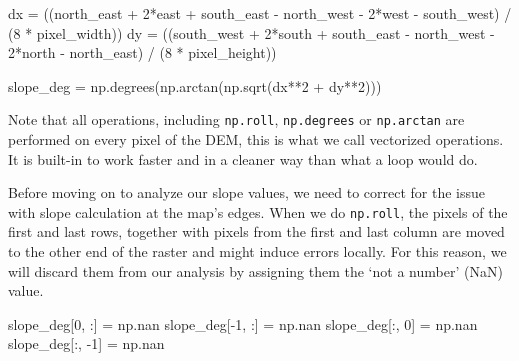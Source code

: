 \documentclass[
  letterpaper,
  DIV=11,
  numbers=noendperiod]{scrartcl}
\newenvironment{Shaded}{\begin{snugshade}}{\end{snugshade}}
\newcommand{\DecValTok}[1]{\textcolor[rgb]{0.68,0.00,0.00}{#1}}
\newcommand{\NormalTok}[1]{\textcolor[rgb]{0.00,0.23,0.31}{#1}}
\newcommand{\OperatorTok}[1]{\textcolor[rgb]{0.37,0.37,0.37}{#1}}
\begin{document}
\begin{Shaded}
\begin{Highlighting}[]
\NormalTok{dx }\OperatorTok{=}\NormalTok{ ((north\_east }\OperatorTok{+} \DecValTok{2}\OperatorTok{*}\NormalTok{east }\OperatorTok{+}\NormalTok{ south\_east }\OperatorTok{{-}}\NormalTok{ north\_west }\OperatorTok{{-}} \DecValTok{2}\OperatorTok{*}\NormalTok{west }\OperatorTok{{-}}\NormalTok{ south\_west)}
      \OperatorTok{/}\NormalTok{ (}\DecValTok{8} \OperatorTok{*}\NormalTok{ pixel\_width))}
\NormalTok{dy }\OperatorTok{=}\NormalTok{ ((south\_west }\OperatorTok{+} \DecValTok{2}\OperatorTok{*}\NormalTok{south }\OperatorTok{+}\NormalTok{ south\_east }\OperatorTok{{-}}\NormalTok{ north\_west }\OperatorTok{{-}} \DecValTok{2}\OperatorTok{*}\NormalTok{north }\OperatorTok{{-}}\NormalTok{ north\_east)}
      \OperatorTok{/}\NormalTok{ (}\DecValTok{8} \OperatorTok{*}\NormalTok{ pixel\_height))}

\NormalTok{slope\_deg }\OperatorTok{=}\NormalTok{ np.degrees(np.arctan(np.sqrt(dx}\OperatorTok{**}\DecValTok{2} \OperatorTok{+}\NormalTok{ dy}\OperatorTok{**}\DecValTok{2}\NormalTok{)))}
\end{Highlighting}
\end{Shaded}

Note that all operations, including \texttt{np.roll},
\texttt{np.degrees} or \texttt{np.arctan} are performed on every pixel
of the DEM, this is what we call vectorized operations. It is built-in
to work faster and in a cleaner way than what a loop would do.

Before moving on to analyze our slope values, we need to correct for the
issue with slope calculation at the map's edges. When we do
\texttt{np.roll}, the pixels of the first and last rows, together with
pixels from the first and last column are moved to the other end of the
raster and might induce errors locally. For this reason, we will discard
them from our analysis by assigning them the `not a number' (NaN) value.

\begin{Shaded}
\begin{Highlighting}[]
\NormalTok{slope\_deg[}\DecValTok{0}\NormalTok{, :]  }\OperatorTok{=}\NormalTok{ np.nan}
\NormalTok{slope\_deg[}\OperatorTok{{-}}\DecValTok{1}\NormalTok{, :] }\OperatorTok{=}\NormalTok{ np.nan}
\NormalTok{slope\_deg[:, }\DecValTok{0}\NormalTok{]  }\OperatorTok{=}\NormalTok{ np.nan}
\NormalTok{slope\_deg[:, }\OperatorTok{{-}}\DecValTok{1}\NormalTok{] }\OperatorTok{=}\NormalTok{ np.nan}
\end{Highlighting}
\end{Shaded}
\end{document}
